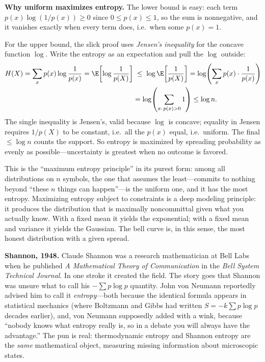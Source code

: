 \begin{whybox}
\textbf{Why uniform maximizes entropy.} The lower bound is easy: each term $p(x)\log(1/p(x)) \ge 0$ since
$0 \le p(x) \le 1$, so the sum is nonnegative, and it vanishes exactly when every term does, i.e.\ when
some $p(x) = 1$.

For the upper bound, the slick proof uses \emph{Jensen's inequality} for the concave function $\log$.
Write the entropy as an expectation and pull the $\log$ outside:
\begin{align*}
  H(X) = \sum_x p(x)\log\frac{1}{p(x)} = \E\!\left[\log\frac{1}{p(X)}\right]
       &\;\le\; \log \E\!\left[\frac{1}{p(X)}\right]
        = \log\!\left(\sum_x p(x)\cdot\frac{1}{p(x)}\right) \\
       &= \log\!\left(\sum_{x:\,p(x)>0} 1\right) \le \log n.
\end{align*}
The single inequality is Jensen's, valid because $\log$ is concave; equality in Jensen requires
$1/p(X)$ to be constant, i.e.\ all the $p(x)$ equal, i.e.\ uniform. The final $\le \log n$ counts the
support. So entropy is maximized by spreading probability as evenly as possible---uncertainty is
greatest when no outcome is favored.
\end{whybox}

\begin{aestheticbox}
This is the ``maximum entropy principle'' in its purest form: among all distributions on $n$ symbols,
the one that assumes the least---commits to nothing beyond ``these $n$ things can happen''---is the
uniform one, and it has the most entropy. Maximizing entropy subject to constraints is a deep modeling
principle: it produces the distribution that is maximally noncommittal given what you actually know. With
a fixed mean it yields the exponential; with a fixed mean and variance it yields the Gaussian. The bell
curve is, in this sense, the most honest distribution with a given spread.
\end{aestheticbox}

\begin{historybox}
\textbf{Shannon, 1948.} Claude Shannon was a research mathematician at Bell Labs when he published
\emph{A Mathematical Theory of Communication} in the \emph{Bell System Technical Journal}. In one stroke
it created the field. The story goes that Shannon was unsure what to call his $-\sum p\log p$ quantity.
John von Neumann reportedly advised him to call it \emph{entropy}---both because the identical formula
appears in statistical mechanics (where Boltzmann and Gibbs had written $S = -k\sum p\log p$ decades
earlier), and, von Neumann supposedly added with a wink, because ``nobody knows what entropy really is,
so in a debate you will always have the advantage.'' The pun is real: thermodynamic entropy and Shannon
entropy are the \emph{same} mathematical object, measuring missing information about microscopic states.
\end{historybox}

